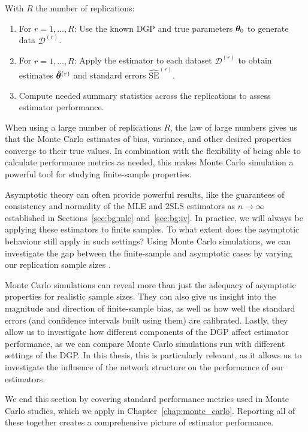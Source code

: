 With $R$ the number of replications:
\begin{enumerate}
    \item For $r = 1, \ldots, R$: Use the known DGP and true parameters $\bm{\theta}_0$ to generate data $\mathcal{D}^{(r)}$.
    \item For $r = 1, \ldots, R$: Apply the estimator to each dataset $\mathcal{D}^{(r)}$ to obtain estimates $\hat{\bm{\theta}}^{(r)}$ and standard errors $\widehat{\text{SE}}^{(r)}$.
    \item Compute needed summary statistics across the replications to assess estimator performance.
\end{enumerate}

When using a large number of replications $R$, the law of large numbers gives us that the Monte Carlo estimates of bias, variance, and other desired properties converge to their true values. In combination with the flexibility of being able to calculate performance metrics as needed, this makes Monte Carlo simulation a powerful tool for studying finite-sample properties.

Asymptotic theory can often provide powerful results, like the guarantees of consistency and normality of the MLE and 2SLS estimators as $n \to \infty$ established in Sections~\ref{sec:bg:mle} and~\ref{sec:bg:iv}. In practice, we will always be applying these estimators to finite samples. To what extent does the asymptotic behaviour still apply in such settings? Using Monte Carlo simulations, we can investigate the gap between the finite-sample and asymptotic cases by varying our replication sample sizes \parencite{MorrisWhiteEtAl2019}.

Monte Carlo simulations can reveal more than just the adequacy of asymptotic properties for realistic sample sizes. They can also give us insight into the magnitude and direction of finite-sample bias, as well as how well the standard errors (and confidence intervals built using them) are calibrated. Lastly, they allow us to investigate how different components of the DGP affect estimator performance, as we can compare Monte Carlo simulations run with different settings of the DGP\@. In this thesis, this is particularly relevant, as it allows us to investigate the influence of the network structure on the performance of our estimators.

We end this section by covering standard performance metrics used in Monte Carlo studies, which we apply in Chapter~\ref{chap:monte_carlo}. Reporting all of these together creates a comprehensive picture of estimator performance.

